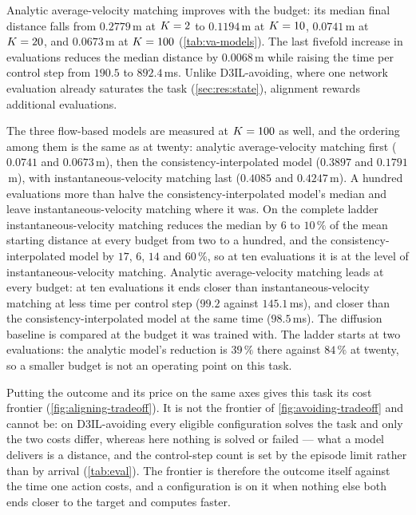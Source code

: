 Analytic average-velocity matching improves with the budget: its median final distance falls from
$0.2779$\,m at $K=2$ to $0.1194$\,m at $K=10$, $0.0741$\,m at $K=20$, and
$0.0673$\,m at $K=100$ (\autoref{tab:va-models}). The last fivefold increase in evaluations reduces the median distance by
$0.0068$\,m while raising the time per control step from $190.5$ to $892.4$\,ms. Unlike D3IL-avoiding,
where one network evaluation already saturates the task (\autoref{sec:res:state}), alignment rewards
additional evaluations.

The three flow-based models are measured at $K=100$ as well, and the ordering among them is the same as
at twenty: analytic average-velocity matching first ($0.0741$ and $0.0673$\,m), then the
consistency-interpolated model ($0.3897$ and $0.1791$\,m), with instantaneous-velocity matching last
($0.4085$ and $0.4247$\,m). A hundred evaluations more than halve the consistency-interpolated model's
median and leave instantaneous-velocity matching where it was. On the complete ladder
instantaneous-velocity matching reduces the median by $6$ to $10\,\%$ of the mean starting distance at every budget from two to a hundred,
and the consistency-interpolated model by $17$, $6$, $14$ and $60\,\%$, so at ten evaluations it is at the
level of instantaneous-velocity matching. Analytic average-velocity matching leads at every budget: at ten
evaluations it ends closer than instantaneous-velocity matching at less time per control step ($99.2$
against $145.1$\,ms), and closer than the consistency-interpolated model at the same time ($98.5$\,ms). The diffusion baseline is compared at the
budget it was trained with. The ladder starts at two evaluations: the analytic model's reduction is $39\,\%$
there against $84\,\%$ at twenty, so a smaller budget is not an operating point on this
task.

Putting the outcome and its price on the same axes gives this task its cost frontier
(\autoref{fig:aligning-tradeoff}). It is not the frontier of \autoref{fig:avoiding-tradeoff} and cannot
be: on D3IL-avoiding every eligible configuration solves the task and only the two costs differ, whereas
here nothing is solved or failed --- what a model delivers is a distance, and the control-step count is
set by the episode limit rather than by arrival (\autoref{tab:eval}). The frontier is therefore the
outcome itself against the time one action costs, and a configuration is on it when nothing else both
ends closer to the target and computes faster.

